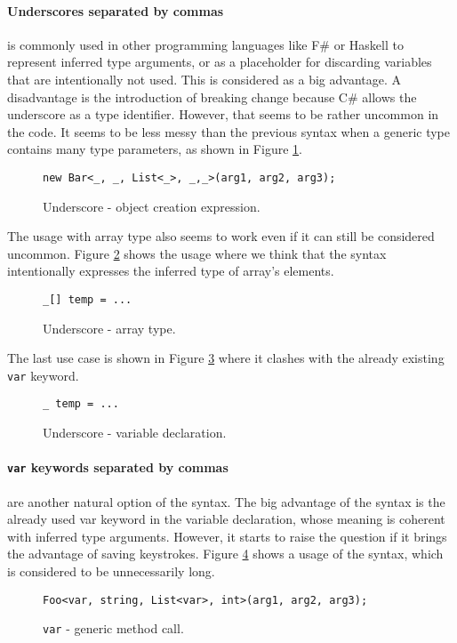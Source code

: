 \paragraph*{Underscores separated by commas} is commonly used in other programming languages like F\# or Haskell to represent inferred type arguments, or as a placeholder for discarding variables that are intentionally not used. 
This is considered as a big advantage. 
A disadvantage is the introduction of breaking change because C\# allows the underscore as a type identifier. 
However, that seems to be rather uncommon in the code. 
It seems to be less messy than the previous syntax when a generic type contains many type parameters, as shown in Figure \ref{img50:opU1}.
\begin{figure}[h!]
\begin{lstlisting}[style=csharp]
new Bar<_, _, List<_>, _,_>(arg1, arg2, arg3);
\end{lstlisting}
\caption{Underscore - object creation expression.}
\label{img50:opU1}
\end{figure}
\par
The usage with array type also seems to work even if it can still be considered uncommon. 
Figure \ref{img51:opU4} shows the usage where we think that the syntax intentionally expresses the inferred type of array’s elements.
\begin{figure}[h!]
\begin{lstlisting}[style=csharp]
_[] temp = ...
\end{lstlisting}
\caption{Underscore - array type.}
\label{img51:opU4}
\end{figure}
\par
The last use case is shown in Figure \ref{img52:opU5} where it clashes with the already existing \texttt{var} keyword.
\begin{figure}[h!]
\begin{lstlisting}[style=csharp]
_ temp = ...
\end{lstlisting}
\caption{Underscore - variable declaration.}
\label{img52:opU5}
\end{figure}


\paragraph*{\texttt{var} keywords separated by commas} are another natural option of the syntax. 
The big advantage of the syntax is the already used var keyword in the variable declaration, whose meaning is coherent with inferred type arguments. 
However, it starts to raise the question if it brings the advantage of saving keystrokes. 
Figure \ref{img52:opV1} shows a usage of the syntax, which is considered to be unnecessarily long.
\begin{figure}[h!]
\begin{lstlisting}[style=csharp]
Foo<var, string, List<var>, int>(arg1, arg2, arg3);
\end{lstlisting}
\caption{\texttt{var} - generic method call.}
\label{img52:opV1}
\end{figure}

